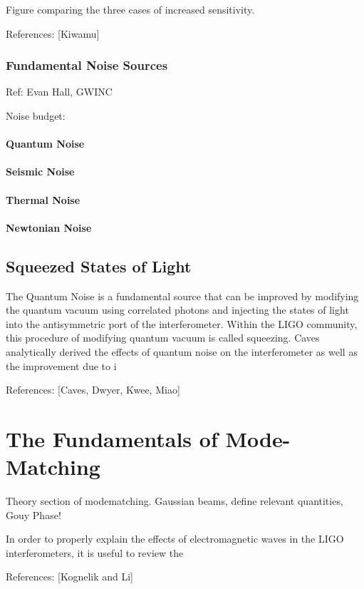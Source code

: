 \documentclass[oneside]{book}
\begin{document}
		Figure comparing the three cases of increased sensitivity.
		
		References: [Kiwamu]
		
		\subsection{Fundamental Noise Sources}
		Ref: Evan Hall, GWINC

		Noise budget:

		\subsubsection{Quantum Noise}
		\subsubsection{Seismic Noise}
		\subsubsection{Thermal Noise}
		\subsubsection{Newtonian Noise}

	
	
	\section{Squeezed States of Light}
	The Quantum Noise is a fundamental source that can be improved by modifying the quantum vacuum using correlated photons and injecting the states of light into the antisymmetric port of the interferometer.  Within the LIGO community, this procedure of modifying quantum vacuum is called squeezing. Caves analytically derived the effects of quantum noise on the interferometer as well as the improvement due to i
	
	References: [Caves, Dwyer, Kwee, Miao]
		
\chapter{The Fundamentals of Mode-Matching}
	Theory section of modematching. Gaussian beams, define relevant quantities, Gouy Phase!
	
	In order to properly explain the effects of electromagnetic waves in the LIGO interferometers, it is useful to review the  
	
	References: [Kognelik and Li]
	
\end{document}
